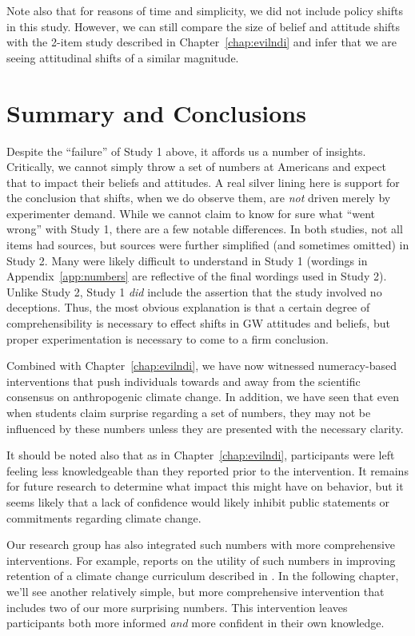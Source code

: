 Note also that for reasons of time and simplicity, we did not include policy
shifts in this study. However, we can still compare the size of belief and
attitude shifts with the 2-item study described in Chapter~\ref{chap:evilndi}
and infer that we are seeing attitudinal shifts of a similar magnitude.

\section{Summary and Conclusions}

Despite the “failure” of Study 1 above, it affords us a number of insights.
Critically, we cannot simply throw a set of numbers at Americans and expect that
to impact their beliefs and attitudes. A real silver lining here is support for
the conclusion that shifts, when we do observe them, are \emph{not} driven
merely by experimenter demand. While we cannot claim to know for sure what “went
wrong” with Study 1, there are a few notable differences.  In both studies, not
all items had sources, but sources were further simplified (and sometimes
omitted) in Study 2. Many were likely difficult to understand in Study 1
(wordings in Appendix~\ref{app:numbers} are reflective of the final wordings
used in Study 2). Unlike Study 2, Study 1 \emph{did} include the assertion that
the study involved no deceptions. Thus, the most obvious explanation is that a
certain degree of comprehensibility is necessary to effect shifts in GW
attitudes and beliefs, but proper experimentation is necessary to come to a firm
conclusion.

Combined with Chapter~\ref{chap:evilndi}, we have now witnessed numeracy-based
interventions that push individuals towards and away from the scientific
consensus on anthropogenic climate change. In addition, we have seen that even
when students claim surprise regarding a set of numbers, they may not be
influenced by these numbers unless they are presented with the necessary clarity.

It should be noted also that as in Chapter~\ref{chap:evilndi}, participants were
left feeling less knowledgeable than they reported prior to the intervention. It
remains for future research to determine what impact this might have on
behavior, but it seems likely that a lack of confidence would likely
inhibit public statements or commitments regarding climate change.

Our research group has also integrated such numbers with  more comprehensive
interventions. For example, \textcite{clark_knowledge_inpress} reports on the
utility of such numbers in improving retention of a climate change curriculum
described in \textcite{felipe_numerical_2012}. In the following chapter, we'll
see another relatively simple, but more comprehensive intervention that includes two
of our more surprising numbers. This intervention leaves participants both more informed
\emph{and} more confident in their own knowledge.

